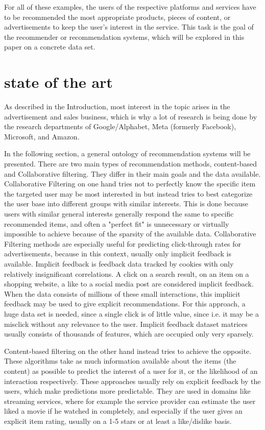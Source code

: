 \documentclass[10pt,draft,journal,a4paper,oneside,twocolumn]{IEEEtran}
\begin{document}
For all of these examples, the users of the respective platforms and services have to be recommended the most appropriate products, pieces of content, or advertisements to keep the user's interest in the service. This task is the goal of the recommender or recommendation systems, which will be explored in this paper on a concrete data set.

\section{state of the art}
As described in the Introduction, most interest in the topic arises in the advertisement and sales business, which is why a lot of research is being done by the research departments of Google/Alphabet, Meta (formerly Facebook), Microsoft, and Amazon.

In the following section, a general ontology of recommendation systems will be presented.
There are two main types of recommendation methods, content-based and Collaborative filtering. They differ in their main goals and the data available. 
Collaborative Filtering on one hand tries not to perfectly know the specific item the targeted user may be most interested in but instead tries to best categorize the user base into different groups with similar interests. This is done because users with similar general interests generally respond the same to specific recommended items, and often a "perfect fit" is unnecessary or virtually impossible to achieve because of the sparsity of the available data.
Collaborative Filtering methods are especially useful for predicting click-through rates for advertisements, because in this context, usually only implicit feedback is available. Implicit feedback is feedback data tracked by cookies with only relatively insignificant correlations. A click on a search result, on an item on a shopping website, a like to a social media post are considered implicit feedback.  When the data consists of millions of these small interactions, this impliicit feedback may be used to give explicit recommendations. For this approach, a huge data set is needed, since a single click is of little value, since i.e. it may be a misclick without any relevance to the user. Implicit feedback dataset matrices usually consists of thousands of features, which are occupied only very sparsely.



Content-based filtering on the other hand instead tries to achieve the opposite. These algorithms take as much information available about the items (the content) as possible to predict the interest of a user for it, or the likelihood of an interaction respectively. These approaches usually rely on explicit feedback by the users, which make predictions more predictable. They are used in domains like streaming services, where for example the service provider can estimate the user liked a movie if he watched in completely, and especially if the user gives an explicit item rating, usually on a 1-5 stars or at least a like/dislike basis.
\end{document}
